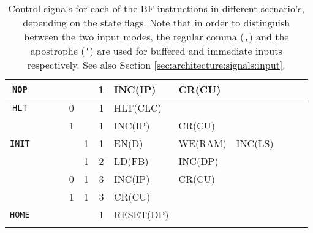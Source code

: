 \begin{longtable}[c] {c|ccccc|c|llllll}
    \rowcolor{White}  \texttt{NOP} &   &   &   &       &      & 1     & INC(IP)  & CR(CU)   &         &        &        &        \\ \hline
    \rowcolor{White} \texttt{HLT} &   &   &   & 0     &      & 1     & HLT(CLC) &          &         &        &        &        \\ 
    \rowcolor{White}               &   &   &   & 1     &      & 1     & INC(IP)  & CR(CU)   &         &        &        &        \\ \hline        
    \rowcolor{White}  \texttt{INIT}&   &   &   &       & 1    & 1     & EN(D)    & WE(RAM)  & INC(LS) &        &        &        \\
    \rowcolor{White}               &   &   &   &       & 1    & 2     & LD(FB)   & INC(DP)  &         &        &        &        \\
    \rowcolor{White}               &   &   &   & 0     & 1    & 3     & INC(IP)  & CR(CU)   &         &        &        &        \\
    \rowcolor{Gray}              &   &   &   & 1     & 1    & 3     & CR(CU)   &          &         &        &        &        \\ \hline
    \rowcolor{White} \texttt{HOME} &   &   &   &       &      & 1     & RESET(DP)    &          &         &        &        &        \\ \hline
    

    \caption{Control signals for each of the BF instructions in different scenario's, depending on the state flags. Note that in order to distinguish between the two input modes, the regular comma (\texttt{,}) and the apostrophe (\texttt{'}) are used for buffered and immediate inputs respectively. See also Section \ref{sec:architecture:signals:input}.}
    \label{tab:microcode}
  \end{longtable}
